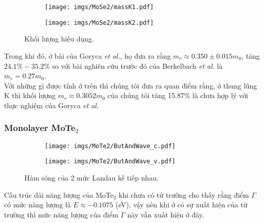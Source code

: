 \documentclass{article}
\begin{document}
\begin{figure}[htb]
	\begin{subfigure}{0.495\textwidth}
		\centering
		\texttt{[image: imgs/MoSe2/massK1.pdf]}
	\end{subfigure}
	\begin{subfigure}{0.495\textwidth}
		\centering
		\texttt{[image: imgs/MoSe2/massK2.pdf]}
	\end{subfigure}
	\caption{Khối lượng hiệu dụng.}
\end{figure}
Trong khi đó, ở bài của Goryca \textit{et al.}\cite{goryca2019}, họ đưa ra rằng $m_{r} \approx 0.350 \pm 0.015 m_{0}$, tăng $24.1\%-35.2\%$ so với bài nghiên cứu trước đó của Berkelbach \textit{et al.} \cite{berkelbach2013} là $m_{r} = 0.27 m_{0}$.\\
Với những gì được tính ở trên thì chúng tôi đưa ra quan điểm rằng, ở thung lũng K thì khối lượng $m_{r} \approx 0.3052 m_{0}$ của chúng tôi tăng 15.87\% là chưa hợp lý với thực nghiệm của Goryca \textit{et al.}



\newpage
\subsubsection*{Monolayer MoTe$_{2}$}
\begin{figure}[htb]
	\begin{subfigure}{0.495\textwidth}
		\centering
		\texttt{[image: imgs/MoTe2/ButAndWave\_c.pdf]}
	\end{subfigure}
	\begin{subfigure}{0.495\textwidth}
		\centering
		\texttt{[image: imgs/MoTe2/ButAndWave\_v.pdf]}
	\end{subfigure}
	\caption{Hàm sóng của 2 mức Landau kế tiếp nhau.}
\end{figure}
Cấu trúc dải năng lượng của MoTe$_{2}$ khi chưa có từ trường cho thấy rằng điểm $\Gamma$ có mức năng lượng là $E \approx -0.1075$ (eV), vậy nên khi ở có sự xuất hiện của từ trường thì mức năng lượng của điểm $\Gamma$ này vẫn xuất hiện ở đây. 
\end{document}
